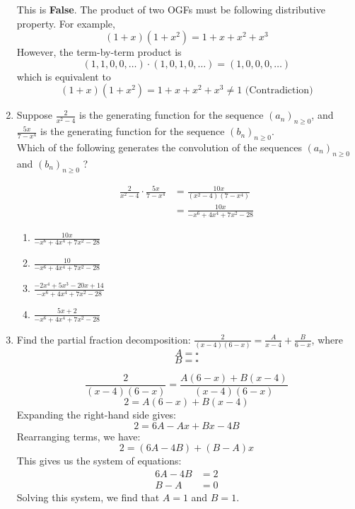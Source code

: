 \documentclass{article}
\theoremstyle{definition}
\begin{document}
\begin{enumerate}
  This is \textbf{False}. The product of two OGFs must be following distributive property.
  For example, 
  $$
  (1+x)(1+x^2) = 1 + x + x^2 + x^3
  $$
  However, the term-by-term product is
  $$
  (1,1,0,0,\ldots) \cdot (1,0,1,0,\ldots) = (1,0,0,0,\ldots)
  $$
  which is equivalent to 
  $$
  (1+x)(1+x^2) = 1 + x + x^2 + x^3 \neq 1 \text{ (Contradiction)}
  $$

  
  
  \newpage

  \item Suppose $\frac{2}{x^2-4}$ is the generating function for the 
  sequence $\left(a_n\right)_{n \geq 0}$, and $\frac{5 x}{7-x^4}$ is 
  the generating function for the sequence $\left(b_n\right)_{n \geq 0}$.\\
  Which of the following generates the convolution of the sequences 
  $\left(a_n\right)_{n \geq 0}$ and $\left(b_n\right)_{n \geq 0}$ ?

  \begin{align*}
    \frac{2}{x^2-4} \cdot \frac{5 x}{7-x^4} &= \frac{10 x}{(x^2-4)(7-x^4)} \\
    &= \frac{10 x}{-x^6+4 x^4+7 x^2-28}
  \end{align*}

  \begin{enumerate}
    \item $\frac{10 x}{-x^6+4 x^4+7 x^2-28}$
    \item $\frac{10}{-x^6+4 x^4+7 x^2-28}$
    \item $\frac{-2 x^4+5 x^3-20 x+14}{-x^6+4 x^4+7 x^2-28}$
    \item $\frac{5 x+2}{-x^6+4 x^4+7 x^2-28}$
  \end{enumerate}

  \item Find the partial fraction decomposition: $\frac{2}{(x-4)(6-x)}=\frac{A}{x-4}+\frac{B}{6-x}$, where
  $$
  A=\square
  $$
  $$
  B=\square
  $$

  $$\frac{2}{(x-4)(6-x)}=\frac{A(6-x)+B(x-4)}{(x-4)(6-x)}$$
  $$2=A(6-x)+B(x-4)$$
  Expanding the right-hand side gives:
  $$2=6A-Ax+Bx-4B$$
  Rearranging terms, we have:
  $$2=(6A-4B)+(B-A)x$$
  This gives us the system of equations:
  \begin{align*}
    6A-4B &= 2 \\
    B-A &= 0
  \end{align*}
  Solving this system, we find that $A=1$ and $B=1$.

\end{enumerate}
\end{document}
